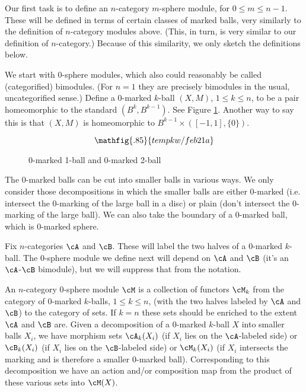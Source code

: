 \medskip

Our first task is to define an $n$-category $m$-sphere module, for $0\le m \le n-1$.
These will be defined in terms of certain classes of marked balls, very similarly
to the definition of $n$-category modules above.
(This, in turn, is very similar to our definition of $n$-category.)
Because of this similarity, we only sketch the definitions below.

We start with $0$-sphere modules, which also could reasonably be called (categorified) bimodules.
(For $n=1$ they are precisely bimodules in the usual, uncategorified sense.)
Define a $0$-marked $k$-ball $(X, M)$, $1\le k \le n$, to be a pair homeomorphic to the standard
$(B^k, B^{k-1})$.
See Figure \ref{feb21a}.
Another way to say this is that $(X, M)$ is homeomorphic to $B^{k-1}\times([-1,1], \{0\})$.

\begin{figure}[!ht]
\begin{equation*}
\mathfig{.85}{tempkw/feb21a}
\end{equation*}
\caption{0-marked 1-ball and 0-marked 2-ball}
\label{feb21a}
\end{figure}

The $0$-marked balls can be cut into smaller balls in various ways.
We only consider those decompositions in which the smaller balls are either
$0$-marked (i.e. intersect the $0$-marking of the large ball in a disc) 
or plain (don't intersect the $0$-marking of the large ball).
We can also take the boundary of a $0$-marked ball, which is $0$-marked sphere.

Fix $n$-categories $\cA$ and $\cB$.
These will label the two halves of a $0$-marked $k$-ball.
The $0$-sphere module we define next will depend on $\cA$ and $\cB$ 
(it's an $\cA$-$\cB$ bimodule), but we will suppress that from the notation.

An $n$-category $0$-sphere module $\cM$ is a collection of functors $\cM_k$ from the category
of $0$-marked $k$-balls, $1\le k \le n$,
(with the two halves labeled by $\cA$ and $\cB$) to the category of sets.
If $k=n$ these sets should be enriched to the extent $\cA$ and $\cB$ are.
Given a decomposition of a $0$-marked $k$-ball $X$ into smaller balls $X_i$, we have
morphism sets $\cA_k(X_i)$ (if $X_i$ lies on the $\cA$-labeled side)
or $\cB_k(X_i)$ (if $X_i$ lies on the $\cB$-labeled side)
or $\cM_k(X_i)$ (if $X_i$ intersects the marking and is therefore a smaller 0-marked ball).
Corresponding to this decomposition we have an action and/or composition map
from the product of these various sets into $\cM(X)$.

